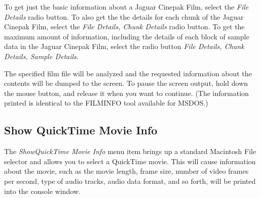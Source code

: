 \documentclass[12pt,letterpaper,twoside]{article}
\begin{document}
To get just the basic information about a Jaguar Cinepak Film, select the \textit{File Details} radio button.
To also get the the details for each chunk of the Jaguar Cinepak Film, select the \textit{File Details, Chunk
Details} radio button. To get the maximum amount of information, including the details of each block
of sample data in the Jaguar Cinepak Film, select the radio button \textit{File Details, Chunk Details, Sample
Details}.

The specified film file will be analyzed and the requested information about the contents will be
dumped to the screen. To pause the screen output, hold down the mouse button, and release it when
you want to continue. (The information printed is identical to the FILMINFO tool available for MSDOS.)

\subsection{Show QuickTime Movie Info}

The \textit{ShowQuickTime Movie Info} menu item brings up a standard Macintosh File selector and allows
you to select a QuickTime movie. This will cause information about the movie, such as the movie
length, frame size, number of video frames per second, type of audio tracks, audio data format, and so
forth, will be printed into the console window.
\end{document}
